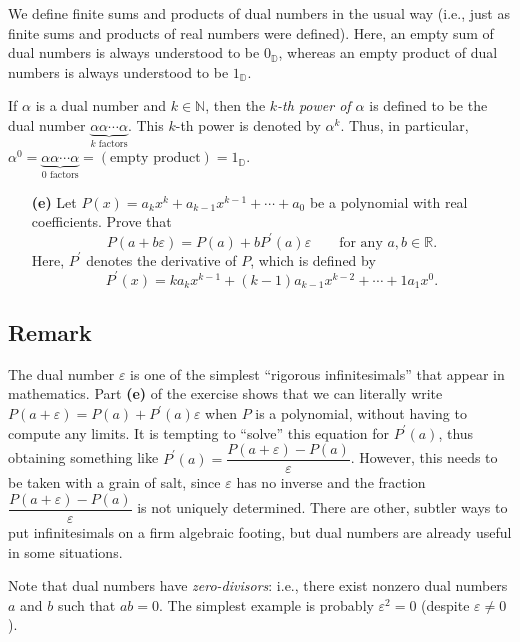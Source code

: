 \documentclass[paper=a4, fontsize=12pt]{scrartcl} %
\newcommand{\RR}{\mathbb{R}} %
\newcommand{\NN}{\mathbb{N}} %
\newcommand{\DD}{{\mathbb{D}}} %
\newcommand{\tup}[1]{\left( #1 \right)}
\newcommand{\eps}{\varepsilon}
\theoremstyle{plainsl}
\theoremstyle{definition}
\theoremstyle{remark}
\begin{document}
We define finite sums and products of dual numbers
in the usual way (i.e., just as finite sums and products
of real numbers were defined).
Here, an empty sum of dual numbers is always understood
to be $0_\DD$, whereas an empty product of dual numbers
is always understood to be $1_\DD$.

If $\alpha$ is a dual number and $k \in \NN$, then
the \textit{$k$-th power of $\alpha$} is defined to be the
dual number
$\underbrace{\alpha \alpha \cdots \alpha}_{k \text{ factors}}$.
This $k$-th power is denoted by $\alpha^k$.
Thus, in particular,
$\alpha^0 =
 \underbrace{\alpha \alpha \cdots \alpha}_{0 \text{ factors}}
= \tup{\text{empty product}} = 1_\DD$.

\begin{enumerate}

\item[\textbf{(e)}]
Let $P\tup{x} = a_k x^k + a_{k-1} x^{k-1} + \cdots + a_0$
be a polynomial with real coefficients.
Prove that
\[
P \tup{a + b \eps}
= P\tup{a} + b P^\prime\tup{a} \eps
\qquad \text{for any } a, b \in \RR .
\]
Here, $P^\prime$ denotes the derivative of $P$, which
is defined by
\[
P^\prime\tup{x}
= k a_k x^{k-1} + \tup{k-1} a_{k-1} x^{k-2} + \cdots + 1 a_1 x^0 .
\]

\end{enumerate}

\subsection{Remark}

The dual number $\eps$ is one of the simplest
``rigorous infinitesimals'' that appear in mathematics.
Part \textbf{(e)} of the exercise shows that we can
literally write
$P \tup{a + \eps}
= P\tup{a} + P^\prime\tup{a} \eps$
when $P$ is a polynomial,
without having to compute any limits.
It is tempting to ``solve'' this equation for
$P^\prime\tup{a}$, thus obtaining something like
$P^\prime\tup{a} = \dfrac{P \tup{a + \eps} - P\tup{a}}{\eps}$.
However, this needs to be taken with a grain of salt,
since $\eps$ has no inverse and the fraction
$\dfrac{P \tup{a + \eps} - P\tup{a}}{\eps}$
is not uniquely determined.
There are other, subtler ways to put infinitesimals
on a firm algebraic footing, but dual numbers are already
useful in some situations.

Note that dual numbers have \textit{zero-divisors}:
i.e., there exist nonzero dual numbers $a$ and $b$ such
that $ab = 0$. The simplest example is probably
$\eps^2 = 0$ (despite $\eps \neq 0$).
\end{document}
